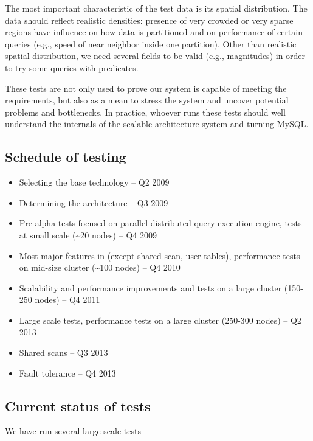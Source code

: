\documentclass[DM,toc]{lsstdoc}
\begin{document}
The most important characteristic of the test data is its spatial
distribution. The data should reflect realistic densities: presence of
very crowded or very sparse regions have influence on how data is
partitioned and on performance of certain queries (e.g., speed of near
neighbor inside one partition). Other than realistic spatial
distribution, we need several fields to be valid (e.g., magnitudes) in
order to try some queries with predicates.

These tests are not only used to prove our system is capable of meeting
the requirements, but also as a mean to stress the system and uncover
potential problems and bottlenecks. In practice, whoever runs these
tests should well understand the internals of the scalable architecture
system and turning MySQL.

\subsection{Schedule of testing}\label{schedule-of-testing}

\begin{itemize}
\item
  Selecting the base technology -- Q2 2009
\item
  Determining the architecture -- Q3 2009
\item
  Pre-alpha tests focused on parallel distributed query execution
  engine, tests at small scale (\textasciitilde{}20 nodes) -- Q4 2009
\item
  Most major features in (except shared scan, user tables), performance
  tests on mid-size cluster (\textasciitilde{}100 nodes) -- Q4 2010
\item
  Scalability and performance improvements and tests on a large cluster
  (150-250 nodes) -- Q4 2011
\item
  Large scale tests, performance tests on a large cluster (250-300
  nodes) -- Q2 2013
\item
  Shared scans -- Q3 2013
\item
  Fault tolerance -- Q4 2013
\end{itemize}

\subsection{Current status of tests}\label{current-status-of-tests}

We have run several large scale tests
\end{document}
